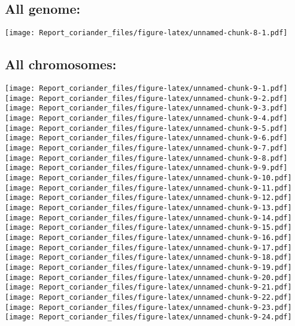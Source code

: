 \documentclass[]{article}
\begin{document}
\hypertarget{all-genome}{%
\subsection{All genome:}\label{all-genome}}

\texttt{[image: Report\_coriander\_files/figure-latex/unnamed-chunk-8-1.pdf]}

\hypertarget{all-chromosomes}{%
\subsection{All chromosomes:}\label{all-chromosomes}}

\texttt{[image: Report\_coriander\_files/figure-latex/unnamed-chunk-9-1.pdf]}
\texttt{[image: Report\_coriander\_files/figure-latex/unnamed-chunk-9-2.pdf]}
\texttt{[image: Report\_coriander\_files/figure-latex/unnamed-chunk-9-3.pdf]}
\texttt{[image: Report\_coriander\_files/figure-latex/unnamed-chunk-9-4.pdf]}
\texttt{[image: Report\_coriander\_files/figure-latex/unnamed-chunk-9-5.pdf]}
\texttt{[image: Report\_coriander\_files/figure-latex/unnamed-chunk-9-6.pdf]}
\texttt{[image: Report\_coriander\_files/figure-latex/unnamed-chunk-9-7.pdf]}
\texttt{[image: Report\_coriander\_files/figure-latex/unnamed-chunk-9-8.pdf]}
\texttt{[image: Report\_coriander\_files/figure-latex/unnamed-chunk-9-9.pdf]}
\texttt{[image: Report\_coriander\_files/figure-latex/unnamed-chunk-9-10.pdf]}
\texttt{[image: Report\_coriander\_files/figure-latex/unnamed-chunk-9-11.pdf]}
\texttt{[image: Report\_coriander\_files/figure-latex/unnamed-chunk-9-12.pdf]}
\texttt{[image: Report\_coriander\_files/figure-latex/unnamed-chunk-9-13.pdf]}
\texttt{[image: Report\_coriander\_files/figure-latex/unnamed-chunk-9-14.pdf]}
\texttt{[image: Report\_coriander\_files/figure-latex/unnamed-chunk-9-15.pdf]}
\texttt{[image: Report\_coriander\_files/figure-latex/unnamed-chunk-9-16.pdf]}
\texttt{[image: Report\_coriander\_files/figure-latex/unnamed-chunk-9-17.pdf]}
\texttt{[image: Report\_coriander\_files/figure-latex/unnamed-chunk-9-18.pdf]}
\texttt{[image: Report\_coriander\_files/figure-latex/unnamed-chunk-9-19.pdf]}
\texttt{[image: Report\_coriander\_files/figure-latex/unnamed-chunk-9-20.pdf]}
\texttt{[image: Report\_coriander\_files/figure-latex/unnamed-chunk-9-21.pdf]}
\texttt{[image: Report\_coriander\_files/figure-latex/unnamed-chunk-9-22.pdf]}
\texttt{[image: Report\_coriander\_files/figure-latex/unnamed-chunk-9-23.pdf]}
\texttt{[image: Report\_coriander\_files/figure-latex/unnamed-chunk-9-24.pdf]}
\end{document}
